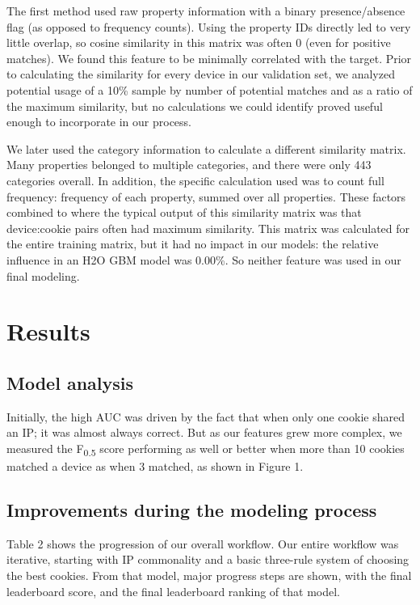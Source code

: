 \documentclass[9pt, journal]{IEEEtran}
\begin{document}
The first method used raw property information with a binary presence/absence flag (as opposed to frequency counts).
Using the property IDs directly led to very little overlap, so cosine similarity in this matrix was often 0 (even for positive matches). We found this feature to be minimally correlated with the target.
Prior to calculating the similarity for every device in our validation set, we analyzed potential usage of a 10\% sample by number of potential matches and as a ratio of the maximum similarity, but no calculations we could identify proved useful enough to incorporate in our process.

We later used the category information to calculate a different similarity matrix. 
Many properties belonged to multiple categories, and there were only 443 categories overall.
In addition, the specific calculation used was to count full frequency: frequency of each property, summed over all properties.
These factors combined to where the typical output of this similarity matrix was that device:cookie pairs often had maximum similarity. 
This matrix was calculated for the entire training matrix, but it had no impact in our models: the relative influence in an H2O GBM model was 0.00\%.
So neither feature was used in our final modeling.

\section{Results}
\subsection{Model analysis}
Initially, the high AUC was driven by the fact that when only one cookie shared an IP; it was almost always correct. 
But as our features grew more complex, we measured the  F\textsubscript{0.5}  score performing as well or better when more than 10 cookies matched a device as when 3 matched, as shown in Figure 1.


\subsection{Improvements during the modeling process}
Table 2 shows the progression of our overall workflow. Our entire workflow was iterative, starting with IP commonality and a basic three-rule system of choosing the best cookies. From that model, major progress steps are shown, with the final leaderboard score, and the final leaderboard ranking of that model.
\end{document}
